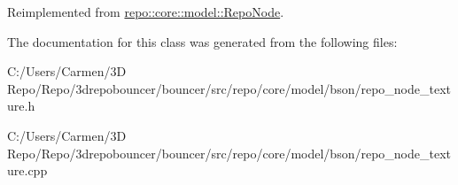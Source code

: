 Reimplemented from \hyperlink{classrepo_1_1core_1_1model_1_1_repo_node_a7c98830a876ee6516587a8f07c7015a5}{repo\+::core\+::model\+::\+Repo\+Node}.



The documentation for this class was generated from the following files\+:\begin{DoxyCompactItemize}
\item 
C\+:/\+Users/\+Carmen/3\+D Repo/\+Repo/3drepobouncer/bouncer/src/repo/core/model/bson/repo\+\_\+node\+\_\+texture.\+h\item 
C\+:/\+Users/\+Carmen/3\+D Repo/\+Repo/3drepobouncer/bouncer/src/repo/core/model/bson/repo\+\_\+node\+\_\+texture.\+cpp\end{DoxyCompactItemize}
